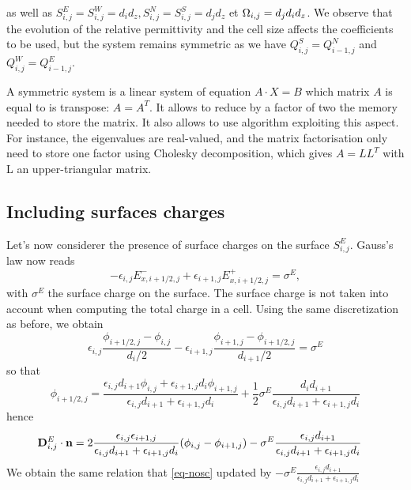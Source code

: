     as well as $S^E_{i,j} = S^W_{i,j} =d_id_z, S^N_{i,j} = S^S_{i,j}= d_jd_z$ et $\Omega_{i,j} = d_jd_id_z$.
    We observe that the evolution of the relative permittivity and the cell size affects the coefficients to be used, but the system remains symmetric as we have $Q^S_{i,j} = Q^N_{i-1,j}$ and $ Q^W_{i,j} = Q^E_{i-1,j}$.
    
    A symmetric system is a linear system of equation $A \cdot X = B$  which matrix $A$ is equal to is transpose: $A = A^T$.
    It allows to reduce by a factor of two the memory needed to store the matrix.
    It also allows to use algorithm exploiting this aspect. For instance, the eigenvalues are real-valued, and the matrix factorisation only need to store one factor using Cholesky decomposition, which gives $A = L L^T$ with L an upper-triangular matrix. 

    \subsection{Including surfaces charges}
    Let's now considerer the presence of surface charges on the surface $S^E_{i,j}$.
    Gauss's law now reads
    \begin{equation} \label{eq-gausslawsc}
      -\epsilon_{i,j}E_{x, i+1/2,j}^- + \epsilon_{i+1,j}E_{x, i+1/2,j}^+ =\sigma^E,
    \end{equation}
    with $\sigma^E$ the surface charge on the surface.
    The surface charge is not taken into account when computing the total charge in a cell.
    Using the same discretization as before, we obtain
    \begin{equation}
    \epsilon_{i,j} \frac{\phi_{i+1/2,j} - \phi_{i,j}}{d_i/2} - \epsilon_{i+1,j} \frac{\phi_{i+1,j} - \phi_{i+1/2,j}}{d_{i+1}/2} = \sigma^E
    \end{equation}
    so that
    \begin{equation}
      \label{eq-phidemi}
    \phi_{i+1/2,j} = \frac{\epsilon_{i,j} d_{i+1} \phi_{i,j} + \epsilon_{i+1,j} d_{i} \phi_{i+1,j} }{\epsilon_{i,j} d_{i+1} + \epsilon_{i+1,j} d_{i} } + \frac{1}{2}\sigma^E \frac{d_i d_{i+1}}{\epsilon_{i,j} d_{i+1} + \epsilon_{i+1,j} d_{i}}
    \end{equation}
    hence
    \begin{align*}
    {\mathbf D}^E_{i,j} \cdot {\mathbf n} &= 2\frac{\epsilon_{i,j}\epsilon_{i+1,j}}{\epsilon_{i,j}d_{i+1} + \epsilon_{i+1,j} d_i} (\phi_{i,j}-\phi_{i+1,j}) - \sigma^E \frac{\epsilon_{i,j}d_{i+1}}{\epsilon_{i,j}d_{i+1}+\epsilon_{i+1,j}d_{i}}
    \end{align*}
    We obtain the same relation that \cref{eq-nosc} updated by $- \sigma^E \frac{\epsilon_{i,j}d_{i+1}}{\epsilon_{i,j}d_{i+1}+\epsilon_{i+1,j}d_{i}}$

